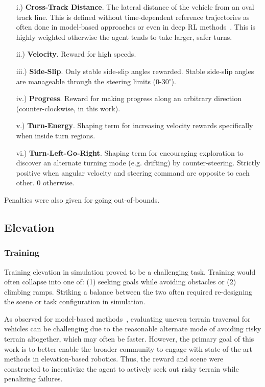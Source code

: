 \begin{appendices}
\begin{enumerate}
    \item[i.)] \textbf{Cross-Track Distance}. The lateral distance of the vehicle from an oval track line. This is defined without time-dependent reference trajectories as often done in model-based approaches or even in deep RL methods~\cite{cai_high-speed_2020}. This is highly weighted otherwise the agent tends to take larger, safer turns.
    \item[ii.)] \textbf{Velocity}. Reward for high speeds.
    \item[iii.)] \textbf{Side-Slip}. Only stable side-slip angles rewarded. Stable side-slip angles are manageable through the steering limits (0-30$^\circ$).
    \item[iv.)] \textbf{Progress}. Reward for making progress along an arbitrary direction (counter-clockwise, in this work).
    \item[v.)] \textbf{Turn-Energy}. Shaping term for increasing velocity rewards specifically when inside turn regions.
    \item[vi.)] \textbf{Turn-Left-Go-Right}. Shaping term for encouraging exploration to discover an alternate turning mode (e.g. drifting) by counter-steering. Strictly positive when angular velocity and steering command are opposite to each other. 0 otherwise.
\end{enumerate}

Penalties were also given for going out-of-bounds.

\subsection{Elevation}

\subsubsection{Training}

Training elevation in simulation proved to be a challenging task. Training would often collapse into one of: (1) seeking goals while avoiding obstacles or (2) climbing ramps. Striking a balance between the two often required re-designing the scene or task configuration in simulation.

As observed for model-based methods~\cite{han_dynamics_2024}, evaluating uneven terrain traversal for vehicles can be challenging due to the reasonable alternate mode of avoiding risky terrain altogether, which may often be faster. However, the primary goal of this work is to better enable the broader community to engage with state-of-the-art methods in elevation-based robotics. Thus, the reward and scene were constructed to incentivize the agent to actively seek out risky terrain while penalizing failures.


\end{appendices}
